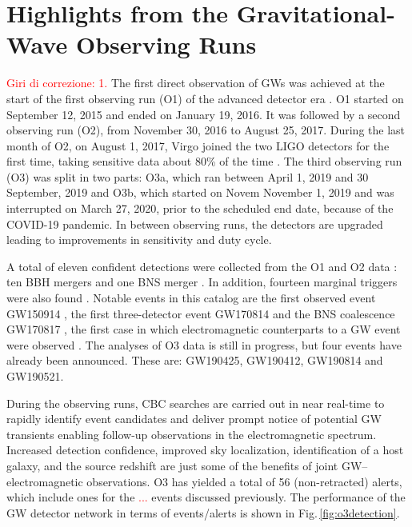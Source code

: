 \documentclass[binding=0.6cm, LaM]{sapthesis}
\newcommand{\fpg}[1]{\textcolor{red}{#1} }
\begin{document}
\chapter{Highlights from the Gravitational-Wave Observing Runs}
\label{ch:ObservingRuns}
\fpg{Giri di correzione: 1.}%
	The first direct observation of GWs was achieved at the start of the first observing run (O1) 
	of the advanced detector era \cite{52}.  
	O1 started on September 12, 2015 and ended on January 19, 2016.  
	It was followed by a second observing run (O2), 
	from November 30, 2016 to August 25, 2017.  
	During the last month of O2, on August 1, 2017, Virgo joined the two LIGO detectors for the first time, 	
	taking sensitive data about 80\% of the time \cite{13}.  
	The third observing run (O3) was split in two parts: O3a, which ran between April 1, 2019 and 30 September, 2019 and O3b, 
	which started on  Novem  November 1, 2019 and was interrupted on March 27, 2020, prior to the scheduled end date, 
	because of the COVID-19 pandemic.  
	In between observing runs, the detectors are upgraded leading to improvements in sensitivity and duty cycle.

	A total of eleven confident detections were collected from the O1 and O2 data \cite{13}: 
	ten BBH mergers \cite{14, 52, 58-60} and one BNS merger \cite{61}.  
	In addition, fourteen marginal triggers were also found \cite{13}.
	Notable events in this catalog are the first observed event GW150914 \cite{52},
	the first three-detector event GW170814 \cite{60} and the BNS
	coalescence GW170817 \cite{62}, the first case in which electromagnetic counterparts to a GW event 
	were observed \cite{15}.
        The analyses of O3 data is still in progress, but four events have already been announced.  
	These are: GW190425, GW190412, GW190814 and GW190521.

	During the observing runs, CBC searches are carried out in near real-time 
	to rapidly identify event candidates and deliver prompt notice of potential GW transients 
	enabling follow-up observations in the electromagnetic spectrum. 
	Increased detection confidence, improved sky localization, identification of a host galaxy, 
	and the source redshift are just some of the benefits of joint GW–electromagnetic observations.  
	O3 has yielded a total of 56 (non-retracted) alerts, which include ones for the \fpg{...} events discussed previously.  
	The performance of the GW detector network in terms of events/alerts is shown in Fig.\,\ref{fig:o3detection}. 
\end{document}
